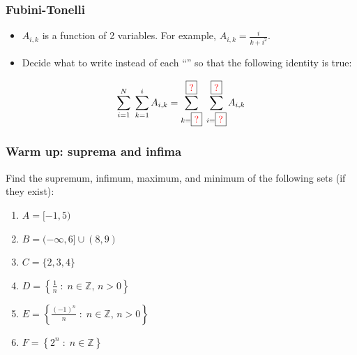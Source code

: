 \documentclass[14pt]{beamer}
\begin{document}
\begin{frame}[t]
	\fontsize{13}{13}\selectfont
	\frametitle{Fubini-Tonelli}

	\begin{itemize}
		\item $A_{i,k}$ is a function of 2 variables. \; For example, $\displaystyle
			A_{i,k}= \frac{i}{k+i^{2}}$.

		\item Decide what to write instead of each ``''
			so that the following identity is true:
	\end{itemize}

	{\fontsize{20}{20}\selectfont \begin{equation*}\sum_{i=1}^{N}\; \sum_{k=1}^{i}A_{i, k}= \sum_{k = \boxed{{\color{red} ?}}}^{\boxed{{\color{red} ?}}}\; \sum_{i=\boxed{{\color{red} ?}}}^{\boxed{{\color{red} ?}}}A_{i,k}\end{equation*} }
\end{frame}

\begin{frame}[t]
	\fontsize{13}{13}\selectfont
	\frametitle{Warm up: suprema and infima}

	Find the supremum, infimum, maximum, and minimum of the following sets (if they
	exist):

	\begin{enumerate}
		\vfill

		\item $\displaystyle A = [-1,5)$
			\vfill

		\item $\displaystyle B = (-\infty,6] \cup (8, 9)$
			\vfill

		\item $\displaystyle C = \{ 2, 3, 4\}$
			\vfill

		\item $\displaystyle D = \left\{ \frac{1}{n}\; : \; n \in \mathbb{Z}, \, n >0
			\right\}$
			\vfill

		\item $\displaystyle E = \left\{ \frac{(-1)^{n}}{n}\; : \; n \in \mathbb{Z},
			\, n >0 \right\}$
			\vfill

		\item $\displaystyle F = \left\{ 2^{n}\; : \; n \in \mathbb{Z}\right\}$
			\vfill
	\end{enumerate}
\end{frame}
\end{document}
